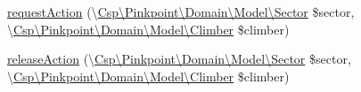\begin{DoxyCompactItemize}
\hyperlink{classCsp_1_1Pinkpoint_1_1Controller_1_1SectorController_a6af2ea1d7d815e38782b7dd39321e20b}{request\+Action} (\textbackslash{}\hyperlink{classCsp_1_1Pinkpoint_1_1Domain_1_1Model_1_1Sector}{Csp\textbackslash{}\+Pinkpoint\textbackslash{}\+Domain\textbackslash{}\+Model\textbackslash{}\+Sector} \$sector, \textbackslash{}\hyperlink{classCsp_1_1Pinkpoint_1_1Domain_1_1Model_1_1Climber}{Csp\textbackslash{}\+Pinkpoint\textbackslash{}\+Domain\textbackslash{}\+Model\textbackslash{}\+Climber} \$climber)
\item 
\hyperlink{classCsp_1_1Pinkpoint_1_1Controller_1_1SectorController_aba90e2f58b9310c9923feab6be98b6fb}{release\+Action} (\textbackslash{}\hyperlink{classCsp_1_1Pinkpoint_1_1Domain_1_1Model_1_1Sector}{Csp\textbackslash{}\+Pinkpoint\textbackslash{}\+Domain\textbackslash{}\+Model\textbackslash{}\+Sector} \$sector, \textbackslash{}\hyperlink{classCsp_1_1Pinkpoint_1_1Domain_1_1Model_1_1Climber}{Csp\textbackslash{}\+Pinkpoint\textbackslash{}\+Domain\textbackslash{}\+Model\textbackslash{}\+Climber} \$climber)
\end{DoxyCompactItemize}
